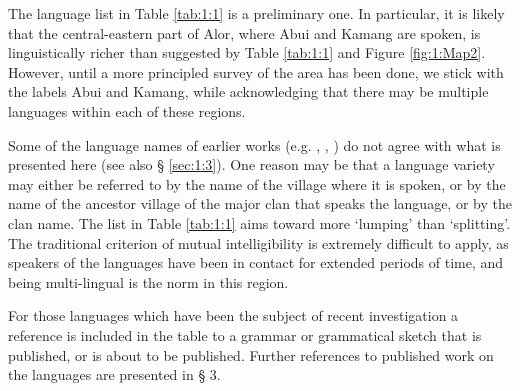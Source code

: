 The language list in Table \ref{tab:1:1} is a preliminary one. In particular, it is likely that the central-eastern part of Alor, where Abui and Kamang are spoken, is linguistically richer than suggested by Table \ref{tab:1:1} and Figure \ref{fig:1:Map2}. However, until a more principled survey of the area has been done, we stick with the labels Abui and Kamang, while acknowledging that there may be multiple languages within each of these regions.

Some of the language names of earlier works (e.g. \citealt{Stokhof1975}, \citealt{GrimesEtAl1997}, \citealt{LewisEtAl2013}) do not agree with what is presented here (see also {\S} \ref{sec:1:3}). One reason may be that a language variety may either be referred to by the name of the village where it is spoken, or by the name of the ancestor village of the major clan that speaks the language, or by the clan name. The list in Table \ref{tab:1:1} aims toward more `lumping' than `splitting'. The traditional criterion of mutual intelligibility is extremely difficult to apply, as speakers of the languages have been in contact for extended periods of time, and being multi-lingual is the norm in this region.

For those languages which have been the subject of recent investigation a reference is included in the table to a grammar or grammatical sketch that is published, or is about to be published. Further references to published work on the languages are presented in {\S} 3.



